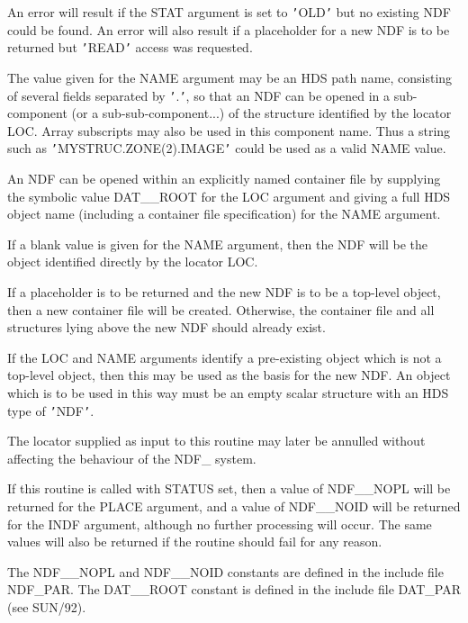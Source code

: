 \documentclass[twoside,11pt]{article}
\newcommand{\xref}[3]{#1}
\newcommand{\hi}[1]{{\tt{#1}}}
\newcommand{\sstitem}{\item}
\newcommand{\sstitem}{\item}
\begin{document}
{{{         \sstitem
         An error will result if the STAT argument is set to \hi{'}OLD\hi{'} but
         no existing NDF could be found. An error will also result if a
         placeholder for a new NDF is to be returned but \hi{'}READ\hi{'} access was
         requested.

         \sstitem
         The value given for the NAME argument may be an HDS path name,
         consisting of several fields separated by \hi{'}.\hi{'}, so that an NDF can
         be opened in a sub-component (or a sub-sub-component...) of the
         structure identified by the locator LOC.  Array subscripts may
         also be used in this component name.  Thus a string such as
         \hi{'}MYSTRUC.ZONE(2).IMAGE\hi{'} could be used as a valid NAME value.

         \sstitem
         An NDF can be opened within an explicitly named container file
         by supplying the symbolic value DAT\_\_ROOT for the LOC argument
         and giving a full HDS object name (including a container file
         specification) for the NAME argument.

         \sstitem
         If a blank value is given for the NAME argument, then the
         NDF will be the object identified directly by the locator LOC.

         \sstitem
         If a placeholder is to be returned and the new NDF is to be a
         top-level object, then a new container file will be created.
         Otherwise, the container file and all structures lying above the
         new NDF should already exist.

         \sstitem
         If the LOC and NAME arguments identify a pre-existing object
         which is not a top-level object, then this may be used as the
         basis for the new NDF. An object which is to be used in this way
         must be an empty scalar structure with an HDS type of \hi{'}NDF\hi{'}.

         \sstitem
         The locator supplied as input to this routine may later be
         annulled without affecting the behaviour of the NDF\_ system.

         \sstitem
         If this routine is called with STATUS set, then a value of
         NDF\_\_NOPL will be returned for the PLACE argument, and a value of
         NDF\_\_NOID will be returned for the INDF argument, although no
         further processing will occur. The same values will also be
         returned if the routine should fail for any reason.

         \sstitem
         The NDF\_\_NOPL and NDF\_\_NOID constants are defined in the
         include file NDF\_PAR. The DAT\_\_ROOT constant is defined in the
         include file DAT\_PAR (see \xref{SUN/92}{sun92}{}).
      }
   }
}
\end{document}
